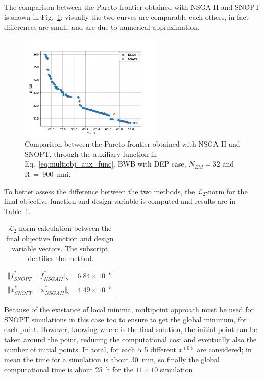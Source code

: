 The comparison between the Pareto frontier obtained with NSGA-II and SNOPT is shown in Fig.~\ref{fig:bwb_hybrid_dep_pareto}: visually the two curves are comparable each others, in fact differences are small, and are due to numerical approximation. 
\begin{figure}[!h]
	\centering
	\includegraphics[keepaspectratio, width=0.6\textwidth]{images/chap4/bwb_pareto}
	\caption{Comparison between the Pareto frontier obtained with NSGA-II and SNOPT, through the auxiliary function in Eq.~\eqref{eq:multiobj_aux_func}. BWB with DEP case, $N_{EM}=32$ and R~=~900~nmi.}
	\label{fig:bwb_hybrid_dep_pareto}
\end{figure}
To better assess the difference between the two methods, the $\mathcal{L}_2$-norm for the final objective function and design variable is computed and results are in Table~\ref{tab:bwb_hybrid_dep_pareto_norm_l2}.
\begin{table}[!h]
	\centering
	\begin{tabular}{l c}
		\hline
		$\Vert\underline{f}^{*}_{SNOPT} - \underline{f}^{*}_{NSGAII}\Vert_2$ & $6.84\times10^{-6}$ \\
		$\Vert\underline{x}^{*}_{SNOPT} - \underline{x}^{*}_{NSGAII}\Vert_2$ & $4.49\times10^{-5}$ \\
		\hline
	\end{tabular}
	\caption{$\mathcal{L}_2$-norm calculation between the final objective function and design variable vectors. The subscript identifies the method.}
	\label{tab:bwb_hybrid_dep_pareto_norm_l2}
\end{table}

Because of the existance of local minima, multipoint approach must be used for SNOPT simulations in this case too to ensure to get the global minimum, for each point. 
However, knowing where is the final solution, the initial point can be taken around the point, reducing the computational cost and eventually also the number of initial points. 
In total, for each $\alpha$ 5 different $x^{(0)}$ are considered; in mean the time for a simulation is about 30~\si{\minute}, so finally the global computational time is about 25~\si{\hour} for the $11\times10$ simulation. 

